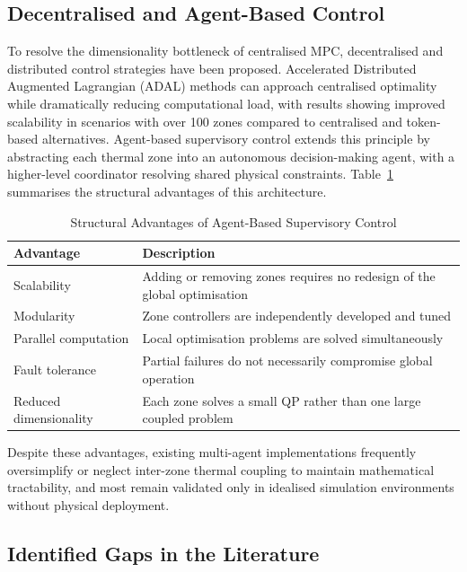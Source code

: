 \documentclass[12pt, a4paper]{article}
\begin{document}
	\subsection{Decentralised and Agent-Based Control}
	
	To resolve the dimensionality bottleneck of centralised MPC, decentralised and distributed control strategies have been proposed. Accelerated Distributed Augmented Lagrangian (ADAL) methods can approach centralised optimality while dramatically reducing computational load, with results showing improved scalability in scenarios with over 100 zones compared to centralised and token-based alternatives. Agent-based supervisory control extends this principle by abstracting each thermal zone into an autonomous decision-making agent, with a higher-level coordinator resolving shared physical constraints. Table~\ref{tab:decentralised_advantages} summarises the structural advantages of this architecture.
	
	\begin{table}[h]
		\centering
		\caption{Structural Advantages of Agent-Based Supervisory Control}
		\label{tab:decentralised_advantages}
		\begin{tabular}{lp{9cm}}
			\toprule
			\textbf{Advantage} & \textbf{Description} \\
			\midrule
			Scalability & Adding or removing zones requires no redesign of the global optimisation \\
			Modularity & Zone controllers are independently developed and tuned \\
			Parallel computation & Local optimisation problems are solved simultaneously \\
			Fault tolerance & Partial failures do not necessarily compromise global operation \\
			Reduced dimensionality & Each zone solves a small QP rather than one large coupled problem \\
			\bottomrule
		\end{tabular}
	\end{table}
	
	Despite these advantages, existing multi-agent implementations frequently oversimplify or neglect inter-zone thermal coupling to maintain mathematical tractability, and most remain validated only in idealised simulation environments without physical deployment.
	
	\subsection{Identified Gaps in the Literature}
	
\end{document}
